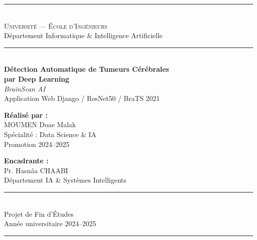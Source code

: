 \documentclass[12pt, a4paper]{report}
\begin{document}
\setcounter{page}{0}

\begin{titlepage}
  \begin{center}


    \rule{\linewidth}{1.5pt}\\[0.3cm]
    {\Large\scshape Université — École d'Ingénieurs}\\[0.1cm]
    {\large Département Informatique \& Intelligence Artificielle}\\
    \rule{\linewidth}{0.8pt}\\[1.5cm]

    {\huge\bfseries\color{blue!70!black}
      Détection Automatique de Tumeurs Cérébrales\\[0.4cm]
      par Deep Learning}\\[0.6cm]

    {\LARGE\itshape BrainScan AI}\\[0.3cm]
    {\large Application Web Django / ResNet50 / BraTS 2021}\\[2cm]

    \begin{minipage}{0.48\textwidth}
      \raggedright
      \textbf{Réalisé par :}\\[0.2cm]
      {\large MOUMEN Doae Malak}\\
      Spécialité : Data Science \& IA\\
      Promotion 2024--2025
    \end{minipage}
    \hfill
    \begin{minipage}{0.48\textwidth}
      \raggedleft
      \textbf{Encadrante :}\\[0.2cm]
      {\large Pr. Hasnâa CHAABI}\\
      Département IA \& Systèmes Intelligents
    \end{minipage}

    \vfill

    \rule{\linewidth}{0.8pt}\\[0.3cm]
    {\large Projet de Fin d'Études}\\[0.1cm]
    {\large Année universitaire 2024--2025}\\[0.3cm]
    \rule{\linewidth}{1.5pt}

  \end{center}
\end{titlepage}
\end{document}

